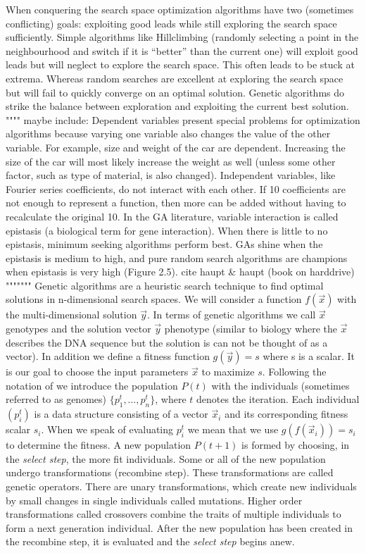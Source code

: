 When conquering the search space optimization algorithms have two (sometimes conflicting) goals: exploiting good leads while still exploring the search space sufficiently. Simple algorithms like Hillclimbing (randomly selecting a point in the neighbourhood and switch if it is ``better'' than the current one) will exploit good leads but will neglect to explore the search space. This often leads to be stuck at extrema. Whereas random searches are excellent at exploring the search space but will fail to quickly converge on an optimal solution. Genetic algorithms do strike the balance between exploration and exploiting the current best solution.
 """"
 maybe include:
 Dependent variables present special problems for optimization algorithms because varying one variable also changes the value of the other variable. For example, size and weight of the car are dependent. Increasing the size of the car will most likely increase the weight as well (unless some other factor, such as type of material, is also changed). Independent variables, like Fourier series coefficients, do not interact with each other. If 10 coefficients are not enough to represent a function, then more can be added without having to recalculate the original 10.
In the GA literature, variable interaction is called epistasis (a biological term for gene interaction). When there is little to no epistasis, minimum seeking algorithms perform best. GAs shine when the epistasis is medium to high, and pure random search algorithms are champions when epistasis is very high (Figure 2.5). cite haupt \& haupt (book on harddrive)
 """""""
Genetic algorithms are a heuristic search technique to find optimal solutions in n-dimensional search spaces. We will consider a function $f(\vec{x})$ with the multi-dimensional solution $\vec{y}$. In terms of genetic algorithms we call $\vec{x}$ genotypes and the solution vector $\vec{y}$ phenotype (similar to biology where the $\vec{x}$ describes the DNA sequence but the solution is can not be thought of as a vector). In addition we define a fitness function $g(\vec{y})=s$ where s is a scalar. It is our goal to choose the input parameters $\vec{x}$  to maximize $s$. 
Following the notation of \citep{Michalewicz:1994:GAD:184675} we introduce the population $P(t)$ with the individuals (sometimes referred to as genomes) $\{p_{1}^{t}, \dots, p_{n}^{t}\}$, where $t$ denotes the iteration. Each individual $(p_{i}^t)$ is a data structure consisting of a vector $\vec{x}_i$ and its corresponding fitness scalar $s_i$.  When we speak of evaluating $p_{i}^{t}$ we mean that we use $g(f(\vec{x}_i))=s_i$ to determine the fitness. A new population $P(t+1)$ is formed by choosing,  in the \textit{select step}, the more fit individuals. Some or all of the new population undergo transformations (recombine step). These transformations are called genetic operators. There are unary transformations, which create new individuals by small changes in single individuals called mutations. Higher order transformations called crossovers combine the traits of multiple individuals to form a next generation individual. 
After the new population has been created in the recombine step, it is evaluated and the \textit{select step} begins anew. 

